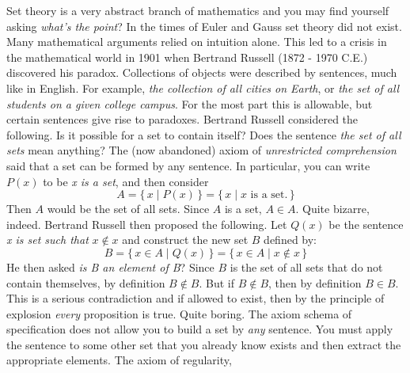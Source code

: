            Set theory is a very abstract branch of mathematics and you may find
            yourself asking \textit{what's the point}? In the times of Euler and
            Gauss set theory did not exist. Many mathematical arguments relied
            on intuition alone. This led to a crisis in the mathematical world
            in 1901 when Bertrand Russell (1872 - 1970 C.E.) discovered his
            paradox. Collections of objects were described by sentences, much
            like in English. For example,
            \textit{the collection of all cities on Earth},
            or \textit{the set of all students on a given college campus}. For
            the most part this is allowable, but certain sentences give rise to
            paradoxes. Bertrand Russell considered the following.
            \textrm{Is it possible for a set to contain itself?} Does the
            sentence \textit{the set of all sets} mean anything? The
            (now abandoned) axiom of \textit{unrestricted comprehension}%
             said
            that a set can be formed by any sentence. In particular, you can
            write $P(x)$ to be \textit{x is a set}, and then consider
            \begin{equation}
                A=\{\,x\;|\;P(x)\,\}=\{\,x\;|\;x\textrm{ is a set.}\,\}
            \end{equation}
            Then $A$ would be the set of all sets. Since $A$ is a set,
            $A\in{A}$. Quite bizarre, indeed. Bertrand Russell then proposed
            the following. Let $Q(x)$ be the sentence
            \textit{x is set such that} $x\notin{x}$ and construct the new
            set $B$ defined by:
            \begin{equation}
                B=\{\,x\in{A}\;|\;Q(x)\,\}=\{\,x\in{A}\;|\;x\notin{x}\,\}
            \end{equation}
            He then asked \textit{is B an element of B}? Since $B$ is the
            set of all sets that do not contain themselves, by definition
            $B\notin{B}$. But if $B\notin{B}$, then by definition $B\in{B}$.
            This is a serious contradiction and if allowed to exist, then by
            the principle of explosion \textit{every} proposition is true.
            Quite boring. The axiom schema of specification does not allow you
            to build a set by \textit{any} sentence. You must apply the
            sentence to some other set that you already know exists and then
            extract the appropriate elements. The axiom of regularity,%
